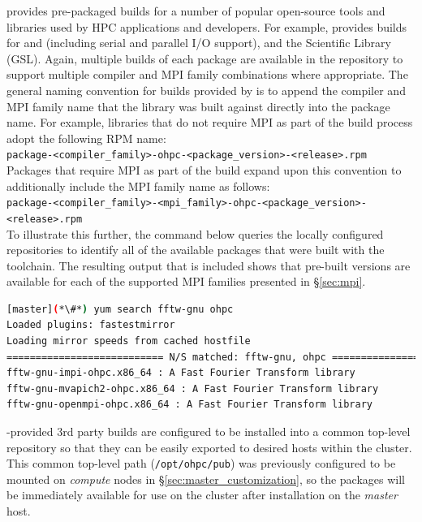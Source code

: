\documentclass[letterpaper]{article}
\begin{document}
\OHPC{} provides pre-packaged builds for a number of popular open-source
tools and libraries used by HPC applications and developers. For
example, \OHPC{} provides builds for \FFTW{} and \hdffive{} (including serial and parallel
I/O support), and the \GNU{} Scientific Library (GSL). Again, multiple builds of
each package are available in the \OHPC{} repository to support multiple compiler
and MPI family combinations where appropriate. The general naming convention
for builds provided by \OHPC{} is to append the compiler and MPI family name that
the library was built against directly into the package name. For example,
libraries that do not require MPI as part of the build process adopt the
following RPM name: \\

\noindent
\texttt{package-<compiler\_family>-ohpc-<package\_version>-<release>.rpm} \\

\noindent Packages that require MPI as part of the build expand upon this convention to
additionally include the MPI family name as follows: \\

\noindent
\texttt{package-<compiler\_family>-<mpi\_family>-ohpc-<package\_version>-<release>.rpm} \\

To illustrate this further, the command below queries the locally configured
repositories to identify all of the available \FFTW{} packages that were built
with the \GNU{} toolchain. The resulting output that is included shows that
pre-built versions are available for each of the supported MPI families
presented in \S\ref{sec:mpi}.

\begin{lstlisting}[language=bash]
[master](*\#*) yum search fftw-gnu ohpc
Loaded plugins: fastestmirror
Loading mirror speeds from cached hostfile
=========================== N/S matched: fftw-gnu, ohpc ===========================
fftw-gnu-impi-ohpc.x86_64 : A Fast Fourier Transform library
fftw-gnu-mvapich2-ohpc.x86_64 : A Fast Fourier Transform library
fftw-gnu-openmpi-ohpc.x86_64 : A Fast Fourier Transform library
\end{lstlisting}

\begin{center}
\begin{tcolorbox}[]
\small
\OHPC{}-provided 3rd party builds are configured to be installed
into a common top-level repository so that they can be easily exported to
desired hosts within the cluster. This common top-level path
(\texttt{/opt/ohpc/pub}) was previously configured to be mounted on {\em
  compute} nodes in \S\ref{sec:master_customization}, so the packages will be
immediately available for use on the cluster after installation on the {\em
  master} host.
\end{tcolorbox}
\end{center}
\end{document}
